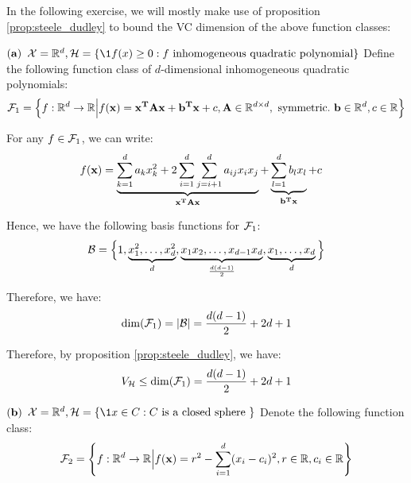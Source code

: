 \begin{solution*}
    In the following exercise, we will mostly make use of proposition \ref{prop:steele_dudley} to bound the VC dimension of the above function classes:
    \begin{subproof}{\newline ${\bf (a)}$ $\X=\R^d, \Hf=\{ \1{f(x)\ge0} : f \text{ inhomogeneous quadratic polynomial} \}$}
        Define the following function class of $d$-dimensional inhomogeneous quadratic polynomials:
        \begin{align*}
            \mathcal{F}_1=\Big\{ 
                f:\mathbb{R}^d\to\mathbb{R} \Big| f({\bf x}) = {\bf x^TAx} + {\bf b^Tx} + c, {\bf A} \in \mathbb{R}^{d\times d}, \text{ symmetric}.  \ {\bf b}\in\mathbb{R}^d, c\in\mathbb{R} 
             \Big\}
        \end{align*}

        \noindent For any $f\in\mathcal{F}_1$, we can write:
        \begin{align*}
            f({\bf x}) &= \underbrace{\sum_{k=1}^d a_k x_k^2 + 2\sum_{i=1}^d \sum_{j=i+1}^d a_{ij}x_ix_j}_{{\bf x^TAx}} + \underbrace{\sum_{l=1}^d b_l x_l}_{{\bf b^Tx}} + c
        \end{align*}

        \noindent Hence, we have the following basis functions for $\mathcal{F}_1$:
        \begin{align*}
            \mathcal{B} = \Big\{ 
                1, \underbrace{x_1^2, \dots, x_d^2}_{d}, \underbrace{x_1x_2, \dots, x_{d-1}x_d}_{\frac{d(d-1)}{2}}, \underbrace{x_1, \dots, x_d}_{d}
             \Big\}
        \end{align*}

        \noindent Therefore, we have:
        \begin{align*}
            \dim(\mathcal{F}_1) = |\mathcal{B}| = \frac{d(d-1)}{2} + 2d + 1
        \end{align*}

        \noindent Therefore, by proposition \ref{prop:steele_dudley}, we have:
        \begin{align*}
            V_{\mathcal{H}} \le \dim(\mathcal{F}_1) = \frac{d(d-1)}{2} + 2d + 1
        \end{align*}
    \end{subproof}

    \begin{subproof}{\newline ${\bf (b)}$ $\X=\R^d, \Hf=\{ \1{x \in C} : C \text{ is a closed sphere }\}$}
        Denote the following function class:
        \begin{align*}
            \mathcal{F}_2 = \Bigg\{ 
                f:\mathbb{R}^d \to \mathbb{R} \Big| f({\bf x}) = r^2 - \sum_{i=1}^d (x_i - c_i)^2, r\in \mathbb{R}, c_i \in \mathbb{R}
             \Bigg\}    
        \end{align*}
        

\end{subproof}
\end{solution*}

